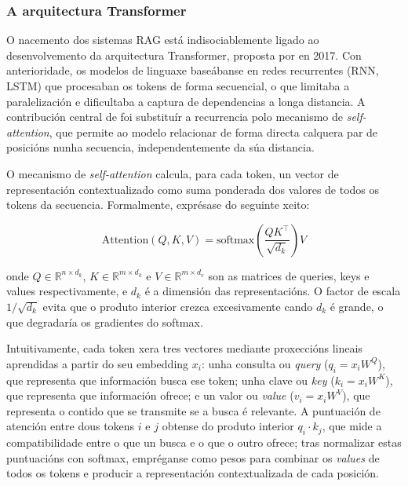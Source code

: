 \documentclass[11pt, a4paper, oneside]{report}
\begin{document}
\subsubsection{A arquitectura Transformer}
\label{sec:transformer}

O nacemento dos sistemas RAG está indisociablemente ligado ao desenvolvemento da
arquitectura Transformer, proposta por \citet{vaswani2017attention} en 2017.
Con anterioridade, os modelos de linguaxe baseábanse en redes recurrentes (RNN, LSTM)
que procesaban os tokens de forma secuencial, o que limitaba a paralelización e dificultaba
a captura de dependencias a longa distancia. A contribución central de
\citeauthor{vaswani2017attention} foi substituír a recurrencia polo mecanismo de
\textit{self-attention}, que permite ao modelo relacionar de forma directa calquera
par de posicións nunha secuencia, independentemente da súa distancia.

O mecanismo de \textit{self-attention} calcula, para cada token, un vector de
representación contextualizado como suma ponderada dos valores de todos os tokens da
secuencia. Formalmente, exprésase do seguinte xeito:

\begin{equation}
  \text{Attention}(Q, K, V) = \text{softmax}\!\left(\frac{QK^\top}{\sqrt{d_k}}\right)V
  \label{eq:attention}
\end{equation}

\noindent onde $Q \in \mathbb{R}^{n \times d_k}$, $K \in \mathbb{R}^{m \times d_k}$
e $V \in \mathbb{R}^{m \times d_v}$ son as matrices de queries, keys e values
respectivamente, e $d_k$ é a dimensión das representacións. O factor de escala
$1/\sqrt{d_k}$ evita que o produto interior crezca excesivamente cando $d_k$ é grande,
o que degradaría os gradientes do softmax.

Intuitivamente, cada token xera tres vectores mediante proxeccións lineais aprendidas
a partir do seu embedding $x_i$: unha consulta ou \textit{query} ($q_i = x_i W^Q$),
que representa que información busca ese token; unha clave ou \textit{key}
($k_i = x_i W^K$), que representa que información ofrece; e un valor ou \textit{value}
($v_i = x_i W^V$), que representa o contido que se transmite se a busca é relevante.
A puntuación de atención entre dous tokens $i$ e $j$ obtense do produto interior
$q_i \cdot k_j$, que mide a compatibilidade entre o que un busca e o que o outro
ofrece; tras normalizar estas puntuacións con softmax, empréganse como pesos para
combinar os \textit{values} de todos os tokens e producir a representación
contextualizada de cada posición.
\end{document}
